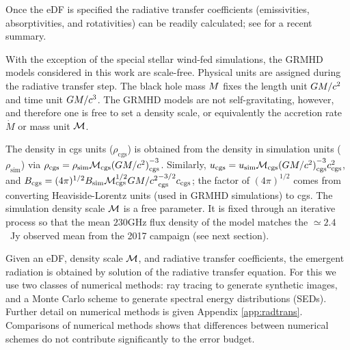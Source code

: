 Once the eDF is specified the radiative transfer coefficients (emissivities, absorptivities, and rotativities) can be readily calculated; see \cite{2021ApJ...921...17M} for a recent summary.



With the exception of the special stellar wind-fed simulations, the GRMHD models considered in this work are scale-free.  Physical units are assigned during the radiative transfer step.  The black hole mass $M$ fixes the length unit $GM/c^2$ and time unit $GM/c^3$.  The GRMHD models are not self-gravitating, however, and therefore one is free to set a density scale, or equivalently the accretion rate $\dot{M}$ or mass unit $\mathcal{M}$.

The density in cgs units ($\rho_\mathrm{cgs}$) is obtained from the density  in simulation units ($\rho_\mathrm{sim}$) via $\rho_\mathrm{cgs} = \rho_\mathrm{sim} \mathcal{M}_\mathrm{cgs} {(GM/c^2)}_\mathrm{cgs}^{-3}$.  Similarly, $u_\mathrm{cgs} = u_\mathrm{sim} \mathcal{M}_\mathrm{cgs} {(GM/c^2)}_\mathrm{cgs}^{-3} c_\mathrm{cgs}^2$, and $B_\mathrm{cgs} = (4\pi)^{1/2} B_\mathrm{sim} \mathcal{M}_\mathrm{cgs}^{1/2} {GM/c^2}_\mathrm{cgs}^{-3/2} c_\mathrm{cgs}$; the factor of $(4\pi)^{1/2}$ comes from converting Heaviside-Lorentz units (used in GRMHD simulations) to cgs.
The simulation density scale $\mathcal{M}$ is a free parameter.  It is fixed through an iterative process so that the mean $230$GHz flux density of the model matches the $\simeq 2.4$~Jy observed mean from the 2017 campaign (see next section).


Given an eDF, density scale $\mathcal{M}$, and radiative transfer coefficients, the emergent radiation is obtained by solution of the radiative transfer equation.  For this we use two classes of numerical methods: ray tracing to generate synthetic images, and a Monte Carlo scheme to generate spectral energy distributions (SEDs).  Further detail on numerical methods is given Appendix \ref{app:radtrans}.  Comparisons of numerical methods \citep[][Prather et al. 2021]{2020ApJ...897..148G} shows that differences between numerical schemes do not contribute significantly to the error budget.  

